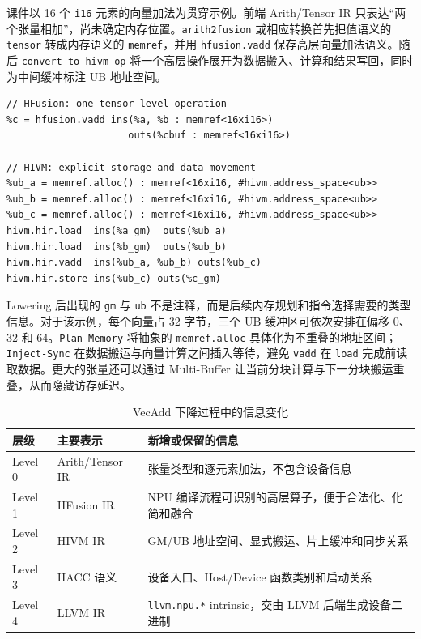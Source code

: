 \documentclass[UTF8,a4paper,10pt]{ctexart}
\begin{document}
课件以 16 个 \texttt{i16} 元素的向量加法为贯穿示例。前端 Arith/Tensor IR 只表达“两个张量相加”，尚未确定内存位置。\texttt{arith2fusion} 或相应转换首先把值语义的 \texttt{tensor} 转成内存语义的 \texttt{memref}，并用 \texttt{hfusion.vadd} 保存高层向量加法语义。随后 \texttt{convert-to-hivm-op} 将一个高层操作展开为数据搬入、计算和结果写回，同时为中间缓冲标注 UB 地址空间。

\begin{lstlisting}[caption={VecAdd 从 HFusion 到 HIVM 的结构变化}]
// HFusion: one tensor-level operation
%c = hfusion.vadd ins(%a, %b : memref<16xi16>)
                     outs(%cbuf : memref<16xi16>)

// HIVM: explicit storage and data movement
%ub_a = memref.alloc() : memref<16xi16, #hivm.address_space<ub>>
%ub_b = memref.alloc() : memref<16xi16, #hivm.address_space<ub>>
%ub_c = memref.alloc() : memref<16xi16, #hivm.address_space<ub>>
hivm.hir.load  ins(%a_gm)  outs(%ub_a)
hivm.hir.load  ins(%b_gm)  outs(%ub_b)
hivm.hir.vadd  ins(%ub_a, %ub_b) outs(%ub_c)
hivm.hir.store ins(%ub_c) outs(%c_gm)
\end{lstlisting}

Lowering 后出现的 \texttt{gm} 与 \texttt{ub} 不是注释，而是后续内存规划和指令选择需要的类型信息。对于该示例，每个向量占 32 字节，三个 UB 缓冲区可依次安排在偏移 0、32 和 64。\texttt{Plan-Memory} 将抽象的 \texttt{memref.alloc} 具体化为不重叠的地址区间；\texttt{Inject-Sync} 在数据搬运与向量计算之间插入等待，避免 \texttt{vadd} 在 \texttt{load} 完成前读取数据。更大的张量还可以通过 Multi-Buffer 让当前分块计算与下一分块搬运重叠，从而隐藏访存延迟。

\begin{table}[H]
  \centering
  \caption{VecAdd 下降过程中的信息变化}
  \begin{tabularx}{\textwidth}{p{2.2cm}p{3.2cm}Y}
    \toprule
    层级 & 主要表示 & 新增或保留的信息 \\
    \midrule
    Level 0 & Arith/Tensor IR & 张量类型和逐元素加法，不包含设备信息 \\
    Level 1 & HFusion IR & NPU 编译流程可识别的高层算子，便于合法化、化简和融合 \\
    Level 2 & HIVM IR & GM/UB 地址空间、显式搬运、片上缓冲和同步关系 \\
    Level 3 & HACC 语义 & 设备入口、Host/Device 函数类别和启动关系 \\
    Level 4 & LLVM IR & \texttt{llvm.npu.*} intrinsic，交由 LLVM 后端生成设备二进制 \\
    \bottomrule
  \end{tabularx}
\end{table}
\end{document}
